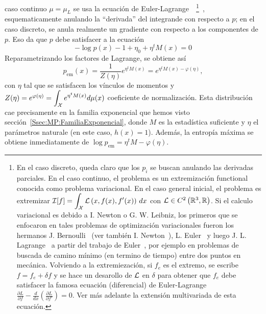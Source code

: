 caso continuo $\mu = \mu_L$ se usa la ecuaci\'on de Euler-Lagrange~ \footnote{En
el caso  discreto, queda claro  que los $p_i$  se buscan anulando  las derivadas
parciales. En  el caso  continuo, el problema  es un  extremizaci\'on functional
conocida como problema variacional.  En el  caso general inicial, el problema es
extremizar $\displaystyle \mathcal{I}[f]  = \int_{\mathcal{X}} \mathcal{L}\left( x , f(x)  , f'(x) \right) \,
dx$ con $\mathcal{L}  \in C^2\left( \mathbb{R}^3 , \mathbb{R} \right)$.   Si el calculo variacional
es debido a I.  Newton o G. W.   Leibniz, los primeros que se enfocaron en tales
problemas   de    optimizaci\'on   variacionales   fueron   los    hermanos   J.
Bernoulli~\cite{Ber1697,       Ber1701,       Ber1718}      (ver       tambi\'en
I. Newton~\cite{New1696}), L.  Euler~\cite{Eul1738, Eul1744, Eul1766} y luego J.
L.   Lagrange~\cite{Lag1760:1,  Lag1760:2,  Lag1766}  a partir  del  trabajo  de
Euler~\cite{Gol80, Fra92, Fra94, BraSan07}, por  ejemplo en problemas de buscada
de  camino m\'inimo  (en  termino de  tiempo) entre  dos  puntos en  mec\'anica.
Volviendo a la extremiezaci\'on, si $f_e$ es el extremo, se escribe $f = f_e +
\delta f$ y se hace un desarollo de  $\mathcal{L}$ en $\delta$ para obtener que $f_e$ debe
satisfacer    la    famosa    ecuaci\'on   (diferencial)    de    Euler-Lagrange
$\displaystyle             \frac{\partial             L}{\partial             f}
- \frac{d}{dx} \left(  \frac{\partial L}{\partial  f'} \right)  = 0$.  Ver m\'as
adelante        la        extensi\'on         multivariada        de        esta
ecuaci\'on.\label{Foot:SZ:EulerLagrange}}~\cite{GelFom63,  Wei74, Bru04,  Cla13,
Kom14}, esquematicamente anulando la ``derivada''  del integrande con respecto a
$p$; en  el caso discreto,  se anula realmente un  gradiente con respecto  a los
componentes de $p$. Eso da que $p$ debe satisfacer a la ecuaci\'on
%
\[
- \log p(x) - 1 + \eta_0 + \eta^t M(x) = 0
\]
%
Reparametrizando los factores de Lagrange, se obtiene as\'i
%
\[
p_{\mathrm{em}}(x) = \frac{1}{Z(\eta)} e^{\eta^t M(x)} = e^{\eta^t M(x) - \varphi(\eta)},
\]
%
con $\eta$  tal que  se satisfacen  los v\'inculos  de momentos  y \  $Z(\eta) =
e^{\varphi(\eta)} =  \displaystyle \int_{\mathcal{X}} e^{\eta^t M(x)}  d\mu(x)$ coeficiente
de  normalizaci\'on.   Esta  distribuci\'on   cae  precisamente  en  la  familia
exponencial  que hemos  visto secci\'on~\ref{Ssec:MP:FamiliaExponencial},  donde
$M$ es  la estad\'istica suficiente y  $\eta$ el par\'ametros naturale  (en este
caso, $h(x) = 1$). Adem\'as, la entrop\'ia m\'axima se obtiene inmediatamente de
$\log p_{\mathrm{em}} = \eta^t M - \varphi(\eta)$.
%

